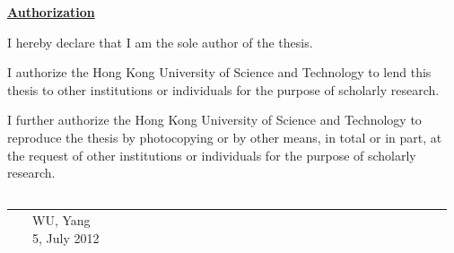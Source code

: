 \begin{center}
{\bf \Large \underline{Authorization}}
\end{center}
\vspace{12mm}

I hereby declare that I am the sole author of the thesis.

\vspace{10mm}

I authorize the Hong Kong University of Science and Technology to lend this
thesis to other institutions or individuals for the purpose of scholarly research.

\vspace{10mm}

I further authorize the Hong Kong University of Science and Technology to
reproduce the thesis by photocopying or by other means, in total or in part, at the
request of other institutions or individuals for the purpose of scholarly research.

\vspace{30mm}

\begin{center}
\underline{~~~~~~~~~~~~~~~~~~~~~~~~~~~~~~~~~~~~~~~~~~~~~~~~~~~~~~~~~~~~~~~~~~~~~~}\\
~~~~WU, Yang \\
~~~~5, July 2012

\end{center}
